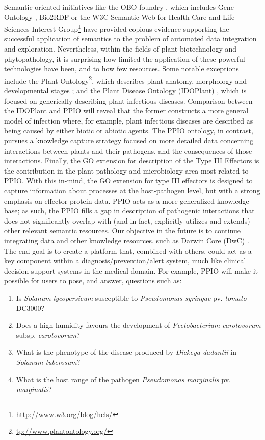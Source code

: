 \documentclass[sw]{iosart2c}
\newcommand{\myurl}[1]{\footnote{\url{#1}}}
\begin{document}
Semantic-oriented initiatives like the OBO foundry \cite{Smith}, which includes Gene Ontology \cite{Gene}, Bio2RDF \cite{RDF} or the W3C Semantic Web for Health Care and Life Sciences Interest Group\myurl{http://www.w3.org/blog/hcls/} have provided copious evidence supporting the successful application of semantics to the problem of automated data integration and exploration. Nevertheless, within the fields of plant biotechnology and phytopathology, it is surprising how limited the application of these powerful technologies have been, and to how few resources. Some notable exceptions include the Plant Ontology\myurl{tp://www.plantontology.org/}, which describes plant anatomy, morphology and developmental stages \cite{PO}; and the Plant Disease Ontology (IDOPlant) \cite{Walls} \cite{IDO}, which is focused on generically describing plant infectious diseases. Comparison between the IDOPlant and PPIO will reveal that the former constructs a more general model of infection where, for example, plant infectious diseases are described as being caused by either biotic or abiotic agents. The PPIO ontology, in contrast, pursues a knowledge capture strategy focused on more detailed data concerning interactions between plants and their pathogens, and the consequences of those interactions. Finally, the GO extension for description of the Type III Effectors \cite{Lindeberg} is the contribution in the plant pathology and microbiology area most related to PPIO. With this in-mind, the GO extension for type III effectors is designed to capture information about processes at the host-pathogen level, but with a strong emphasis on effector protein data. PPIO acts as a more generalized knowledge base; as such, the PPIO fills a gap in description of pathogenic interactions that does not significantly overlap with (and in fact, explicitly utilizes and extends) other relevant semantic resources.  Our objective in the future is to continue integrating data and other knowledge resources, such as Darwin Core (DwC) \cite{Wieczorek2013}. The end-goal is to create a platform that, combined with others, could act as a key component within a diagnosis/prevention/alert system, much like clinical decision support systems in the medical domain. For example, PPIO will make it possible for users to pose, and answer, questions such as:

\begin{enumerate}
\item Is {\itshape Solanum lycopersicum} susceptible to {\itshape Pseudomonas syringae} pv. {\itshape tomato} DC3000?
\item Does a high humidity favours the development of {\itshape Pectobacterium carotovorum} subsp. {\itshape carotovorum}?
\item What is the phenotype of the disease produced by {\itshape Dickeya dadantii} in {\itshape Solanum tuberosum}?
\item What is the host range of the pathogen {\itshape Pseudomonas marginalis} pv. {\itshape marginalis}?

\end{enumerate}
\end{document}
